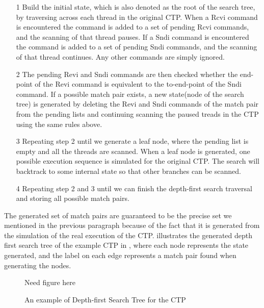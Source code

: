 \begin{itemize}
\item[1] Build the initial state, which is also denoted as the root of the search tree, by traversing across each thread in the original CTP. When a Rcvi command is encountered the command is added to a set of pending Rcvi commands, and the scanning of that thread pauses. If a Sndi command is encountered the command is added to a set of pending Sndi commands, and the scanning of that thread continues. Any other commands are simply ignored.
\item[2] The pending Revi and Sndi commands are then checked whether the end-point of the Revi command is equivalent to the to-end-point of the Sndi command. If a possible match pair exists, a new state(node of the search tree) is generated by deleting the Revi and Sndi commands of the match pair from the pending lists and continuing scanning the paused treads in the CTP using the same rules above.
\item[3] Repeating step 2 until we generate a leaf node, where the pending list is empty and all the threads are scanned. When a leaf node is generated, one possible execution sequence is simulated for the original CTP. The search will backtrack to some internal state so that other branches can be scanned.
\item[4] Repeating step 2 and 3 until we can finish the depth-first search traversal and storing all possible match pairs.
\end{itemize}

The generated set of match pairs are guaranteed to be the precise set we mentioned in the previous paragraph because of the fact that it is generated from the simulation of the real execution of the CTP.  illustrates the generated depth first search tree of the example CTP in , where each node represents the state generated, and the label on each edge represents a match pair found when generating the nodes.
\begin{figure}
Need figure here
\begin{comment}
   \begin{tikzpicture}
   \tikzstyle{every node}=[circle,draw]
\node(root) {root}
  child{ node(A) {A}
        child{node(B) {B} child{node(C) {C} child{node(D){D} child{node(L){L}}}}}
        child{node (E) {E} 
                child{node(F){F} child{node(G){G} child{node(H){H}}}}
                child{node(I){I} child{node(J){J} child{node(K){K}}}}}};

\tikzstyle{every node}=[->]
\path
(root) edge node[right]{} (A)
(A) edge node[left]{(RcviC, Sndi2)} (B)
    edge node[right]{(RcviA, Sndi1)} (E)
(B) edge node[left]{(RcviA, Sndi3)} (C)
(C) edge node[left]{(RcviB, Sndi1)} (D)
(E) edge node[left]{(RcviC, Sndi2)} (F)
    edge node[right]{(RcviB, Sndi3)} (I)
(F) edge node[left]{(RcviB, Sndi3)} (G)
(I) edge node[right]{(RcviC, Sndi2)} (J);

\end{tikzpicture}
\end{comment}
\caption{An example of Depth-first Search Tree for the CTP}
\label{fig:search_tree}
\end{figure}


